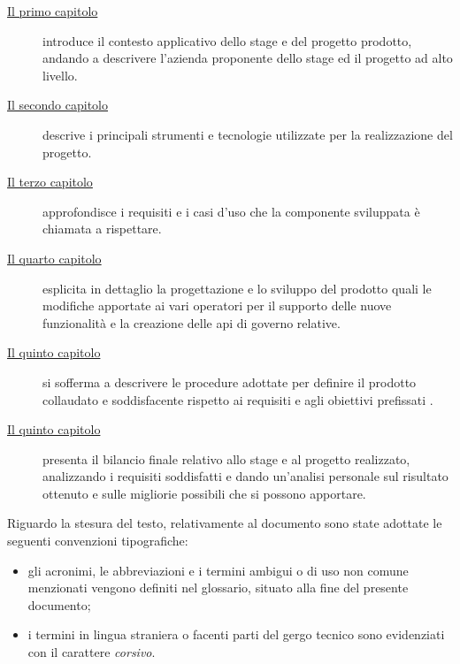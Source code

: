 \begin{description}
	\item[{\hyperref[cap:introduzione]{Il primo capitolo}}] introduce il contesto applicativo dello stage e del progetto prodotto, andando a descrivere l'azienda proponente dello stage ed il progetto ad alto livello.
 
    \item[{\hyperref[cap:strumenti-tecnologie]{Il secondo capitolo}}] descrive i principali strumenti e tecnologie utilizzate per la realizzazione del progetto.
    
    \item[{\hyperref[cap:analisi-requisiti]{Il terzo capitolo}}] approfondisce i requisiti e i casi d'uso che la componente sviluppata è chiamata a rispettare.
    
    \item[{\hyperref[cap:progettazione-codifica]{Il quarto capitolo}}] esplicita in dettaglio la progettazione e lo sviluppo del prodotto quali le modifiche apportate ai vari operatori per il supporto delle nuove funzionalità e la creazione delle \gls{api} di governo relative.
    
    \item[{\hyperref[cap:verifica-validazione]{Il quinto capitolo}}] si sofferma a descrivere le procedure adottate per definire il prodotto collaudato e soddisfacente rispetto ai requisiti e agli obiettivi prefissati .
    
    \item[{\hyperref[cap:conclusioni]{Il quinto capitolo}}] presenta il bilancio finale relativo allo stage e al progetto realizzato, analizzando i requisiti soddisfatti e dando un'analisi personale sul risultato ottenuto e sulle migliorie possibili che si possono apportare.
\end{description}

Riguardo la stesura del testo, relativamente al documento sono state adottate le seguenti convenzioni tipografiche:
\begin{itemize}
	\item gli acronimi, le abbreviazioni e i termini ambigui o di uso non comune menzionati vengono definiti nel glossario, situato alla fine del presente documento;
	\item i termini in lingua straniera o facenti parti del gergo tecnico sono evidenziati con il carattere \emph{corsivo}.
\end{itemize}